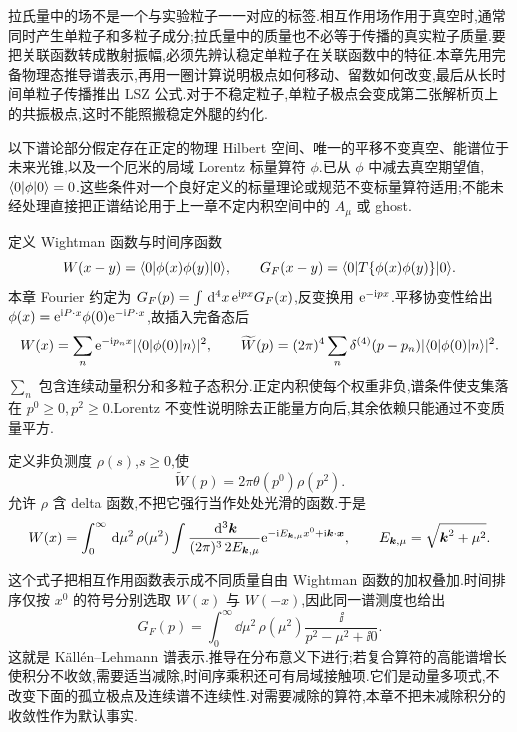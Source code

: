 \label{chap:spectral-lsz}

拉氏量中的场不是一个与实验粒子一一对应的标签.相互作用场作用于真空时,通常同时产生单粒子和多粒子成分;拉氏量中的质量也不必等于传播的真实粒子质量.要把关联函数转成散射振幅,必须先辨认稳定单粒子在关联函数中的特征.本章先用完备物理态推导谱表示,再用一圈计算说明极点如何移动、留数如何改变,最后从长时间单粒子传播推出 LSZ 公式.对于不稳定粒子,单粒子极点会变成第二张解析页上的共振极点,这时不能照搬稳定外腿的约化.

以下谱论部分假定存在正定的物理 Hilbert 空间、唯一的平移不变真空、能谱位于未来光锥,以及一个厄米的局域 Lorentz 标量算符 $\phi$.已从 $\phi$ 中减去真空期望值,$\langle 0\rvert\phi\lvert 0\rangle=0$.这些条件对一个良好定义的标量理论或规范不变标量算符适用;不能未经处理直接把正谱结论用于上一章不定内积空间中的 $A_\mu$ 或 ghost.

定义 Wightman 函数与时间序函数
\[
 W(x-y)=\langle 0\rvert\phi(x)\phi(y)\lvert 0\rangle,\qquad
 G_F(x-y)=\langle 0\rvert T\{\phi(x)\phi(y)\}\lvert 0\rangle.
\]
本章 Fourier 约定为 $G_F(p)=\int\,\mathrm d^4x\,\mathrm e^{\mathrm i px}G_F(x)$,反变换用 $\mathrm e^{-\mathrm i px}$.平移协变性给出 $\phi(x)=\mathrm e^{\mathrm i P\cdot x}\phi(0)\mathrm e^{-\mathrm i P\cdot x}$,故插入完备态后
\begin{equation}\label{eq:spectral-completeness}
 W(x)=\sum_n\mathrm e^{-\mathrm i p_nx}|\langle 0\rvert\phi(0)\lvert n\rangle|^2,
 \qquad \widetilde W(p)=(2\pi)^4\sum_n\delta^{(4)}(p-p_n)|\langle 0\rvert\phi(0)\lvert n\rangle|^2.
\end{equation}
$\sum_n$ 包含连续动量积分和多粒子态积分.正定内积使每个权重非负,谱条件使支集落在 $p^0\geq0,p^2\geq0$.Lorentz 不变性说明除去正能量方向后,其余依赖只能通过不变质量平方.

\begin{definition}[谱密度]
定义非负测度 $\rho(s)$,$s\geq0$,使
\begin{equation}\label{eq:rho-definition}
 \widetilde W(p)=2\pi\theta(p^0)\rho(p^2).
\end{equation}
允许 $\rho$ 含 delta 函数,不把它强行当作处处光滑的函数.于是
\[
 W(x)=\int_0^\infty\,\mathrm d\mu^2\,\rho(\mu^2)
 \int\frac{\,\mathrm d^3\boldsymbol k}{(2\pi)^3\,2E_{\boldsymbol k,\mu}}
 \mathrm e^{-\mathrm i E_{\boldsymbol k,\mu}x^0+\mathrm i\boldsymbol k\cdot\boldsymbol x},
 \qquad E_{\boldsymbol k,\mu}=\sqrt{\boldsymbol k^2+\mu^2}.
\]
\end{definition}

这个式子把相互作用函数表示成不同质量自由 Wightman 函数的加权叠加.时间排序仅按 $x^0$ 的符号分别选取 $W(x)$ 与 $W(-x)$,因此同一谱测度也给出
\begin{equation}\label{eq:KL}
 G_F(p)=\int_0^\infty\dd\mu^2\,\rho(\mu^2)
 \frac{\ii}{p^2-\mu^2+\ii0}.
\end{equation}
这就是 Källén--Lehmann 谱表示.推导在分布意义下进行;若复合算符的高能谱增长使积分不收敛,需要适当减除,时间序乘积还可有局域接触项.它们是动量多项式,不改变下面的孤立极点及连续谱不连续性.对需要减除的算符,本章不把未减除积分的收敛性作为默认事实.

